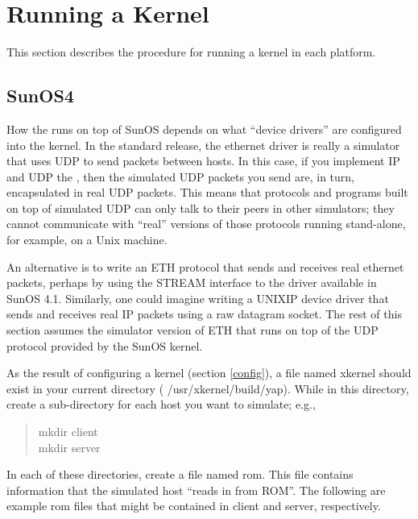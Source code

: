 %
%
%

\section{Running a Kernel}
\label{running}

This section describes the procedure for running a kernel
in each platform. 

\subsection{SunOS4}
\label{running_sunos}

How the \xk{} runs on top of SunOS depends on what ``device drivers''
are configured into the kernel. In the standard release, the ethernet
driver is really a simulator that uses UDP to send packets between
hosts. In this case, if you implement IP and UDP  the
\xk{}, then the simulated UDP packets you send are, in turn, encapsulated
in real UDP packets. This means that protocols and programs built on top
of simulated UDP can only talk to their peers in other simulators; they
cannot communicate with ``real'' versions of those protocols running 
stand-alone, for example, on a Unix machine.  

An alternative is to write an ETH protocol that sends and receives
real ethernet packets, perhaps by using the STREAM interface to the
driver available in SunOS 4.1. Similarly, one could imagine writing a
UNIXIP device driver that sends and receives real IP packets using a
raw datagram socket. The rest of this section assumes the simulator
version of ETH that runs on top of the UDP protocol provided by the
SunOS kernel.

As the result of configuring a kernel (section \ref{config}), a file named
{\sanss xkernel} should exist in your current directory ({\sanss 
/usr/xkernel/build/yap}). While in this directory, create a sub-directory
for each host you want to simulate; e.g.,

\begin{quote}
\begin{tt}
mkdir client\\
mkdir server
\end{tt}
\end{quote}

In each of these directories, create a file named {\sanss rom}.  This file
contains information that the simulated host ``reads in from ROM''. The
following are example {\sanss rom} files that might be contained in
{\sanss client} and {\sanss server}, respectively.

